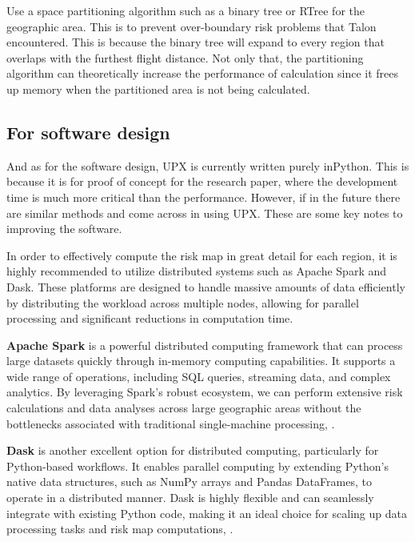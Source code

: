 \documentclass[12pt]{report}
\begin{document}
        Use a space partitioning algorithm such as a binary tree or RTree for the geographic area. This is to prevent
        over-boundary risk problems that Talon encountered. This is because the binary tree will expand to every region
        that overlaps with the furthest flight distance. Not only that, the partitioning algorithm can theoretically
        increase the performance of calculation since it frees up memory when the partitioned area is not being
        calculated.

        \subsection{For software design}
        And as for the software design, UPX is currently written purely inPython. This is because it is for proof of
        concept for the research paper, where the development time is much more critical than the performance. However,
        if in the future there are similar methods and come across in using UPX. These are some key notes to improving
        the software.

        In order to effectively compute the risk map in great detail for each region, it is highly recommended to
        utilize distributed systems such as Apache Spark and Dask. These platforms are designed to handle massive
        amounts of data efficiently by distributing the workload across multiple nodes, allowing for parallel processing
        and significant reductions in computation time.
        
        \textbf{Apache Spark} is a powerful distributed computing framework that can process large datasets quickly
        through in-memory computing capabilities. It supports a wide range of operations, including SQL queries,
        streaming data, and complex analytics. By leveraging Spark's robust ecosystem, we can perform extensive risk
        calculations and data analyses across large geographic areas without the bottlenecks associated with traditional
        single-machine processing, \cite{the_apache_software_foundation_sparkr_2024}.
        
        \textbf{Dask} is another excellent option for distributed computing, particularly for Python-based workflows. It
        enables parallel computing by extending Python's native data structures, such as NumPy arrays and Pandas
        DataFrames, to operate in a distributed manner. Dask is highly flexible and can seamlessly integrate with
        existing Python code, making it an ideal choice for scaling up data processing tasks and risk map computations, 
        \cite{dask_development_team_dask_2016}.
        
\end{document}

